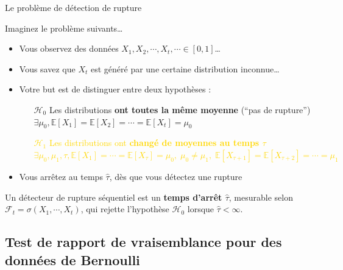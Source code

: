\documentclass[11pt,french,ignorenonframetext,]{beamer}
\begin{document}
\begin{frame}{Le problème de détection de rupture}

  Imaginez le problème suivants\ldots

  \begin{itemize}
    \item Vous observez des données $X_1,X_2,\cdots,X_t,\cdots \in[0,1]$\ldots
    \item Vous savez que $X_t$ est généré par une certaine distribution \alert{inconnue}\ldots

    \pause
    \item \alert{Votre but} est de distinguer entre deux hypothèses :
    \begin{itemize}
      \item[\textcolor{deeppurple}{$\mathcal{H}_0$}] \textcolor{deeppurple}{Les distributions \textbf{ont toutes la même moyenne} \hfill{} (``pas de rupture'')\\
      $\exists \mu_0, \mathbb{E}[X_1] = \mathbb{E}[X_2] = \cdots = \mathbb{E}[X_t] = \mu_0$}

      \item[\textcolor{gold}{$\mathcal{H}_1$}] \textcolor{gold}{Les distributions ont \textbf{changé de moyennes au temps $\tau$} \\
      $\exists \mu_0, \mu_1, \tau, \mathbb{E}[X_1] = \cdots = \mathbb{E}[X_{\tau}] = \mu_0, \; \mu_0 \neq \mu_1, \; \mathbb{E}[X_{\tau+1}] = \mathbb{E}[X_{\tau+2}] = \cdots = \mu_1$}
    \end{itemize}
    \item Vous arrêtez au temps $\widehat{\tau}$, dès que vous détectez une rupture
  \end{itemize}

  \pause
  Un \alert{détecteur de rupture séquentiel} est un \alert{\textbf{temps d'arrêt $\widehat{\tau}$}},
  mesurable selon $\mathcal{F}_t = \sigma(X_1,\cdots,X_t)$,
  qui rejette l'hypothèse \textcolor{deeppurple}{$\mathcal{H}_0$}
  lorsque $\widehat{\tau} < \infty$.

\end{frame}


\subsection{\hfill{}Test de rapport de vraisemblance pour des données de Bernoulli\hfill{}}
\end{document}
